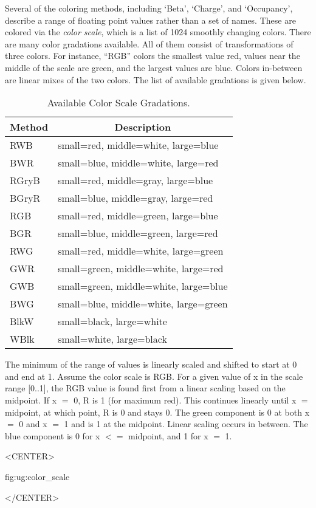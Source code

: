 Several of the coloring methods, including `Beta', `Charge', and
`Occupancy', describe a range of floating point values rather than a
set of names.  These are colored via the {\em color scale}, which is a
list of 1024 smoothly changing colors.  There are many color gradations
available.  All of them consist of transformations of three colors.
For instance, ``RGB'' colors the smallest value red, values near the
middle of the scale are green, and the largest values are blue.
Colors in-between are linear mixes of the two colors.  The list of 
available gradations is given below.


\begin{table}[htb]
  \hspace{0.7in}
  \begin{tabular}{|l|l|} \hline
    \multicolumn{1}{|c}{Method} &
        \multicolumn{1}{|c|}{Description} \\ \hline\hline
    RWB         & small=red,   middle=white, large=blue \\
    BWR         & small=blue,  middle=white, large=red \\
    RGryB       & small=red,   middle=gray,  large=blue \\
    BGryR       & small=blue,  middle=gray,  large=red \\
    RGB         & small=red,   middle=green, large=blue \\
    BGR         & small=blue,  middle=green, large=red \\
    RWG         & small=red,   middle=white, large=green \\
    GWR         & small=green, middle=white, large=red \\
    GWB         & small=green, middle=white, large=blue \\
    BWG         & small=blue,  middle=white, large=green \\
    BlkW        & small=black, large=white \\
    WBlk        & small=white, large=black \\ \hline
  \end{tabular}
  \caption{Available Color Scale Gradations.}
  \label{table:ug:gradmethods}
\end{table}


The minimum of the range of values is linearly scaled and shifted to
start at 0 and end at 1.  Assume the color scale is RGB.  For a given
value of x in the scale range [0..1], the RGB value is found first
from a linear scaling based on the midpoint.
If x $=$ 0, R is 1 (for maximum red).  This continues linearly until x
$=$ midpoint, at which point, R is 0 and stays 0.
The green component is 0 at both x $=$ 0 and x $=$ 1 and is 1 at the
midpoint.  Linear scaling occurs in between.
The blue component is 0 for x $<=$ midpoint, and 1 for x $=$ 1.
\begin{rawhtml}
<CENTER>
\end{rawhtml}
{fig:ug:color_scale}
\begin{rawhtml}
</CENTER>
\end{rawhtml}

